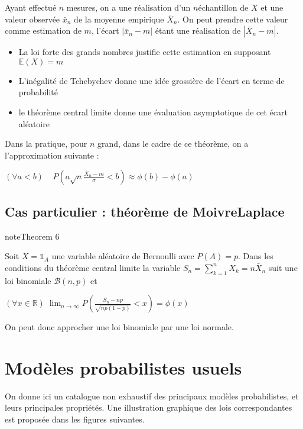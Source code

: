 \documentclass[letterpaper,10pt,english]{jupyterBook}
\begin{document}
\sphinxAtStartPar
Ayant effectué \(n\) mesures, on a une réalisation d’un \(n\)\sphinxhyphen{}échantillon de \(X\) et une valeur observée \(\bar x_n\) de la moyenne empirique \(\bar X_n\). On peut prendre cette valeur comme estimation de \(m\), l’écart \(|\bar x_n-m|\) étant une réalisation de \(|\bar X_n-m|\).
\begin{itemize}
\item {} 
\sphinxAtStartPar
La loi forte des grands nombres justifie cette estimation en supposant  \(\mathbb{E}(X)=m\)

\item {} 
\sphinxAtStartPar
L’inégalité de Tchebychev donne une idée grossière de l’écart en terme de probabilité

\item {} 
\sphinxAtStartPar
le théorème central limite donne une évaluation asymptotique de cet écart aléatoire

\end{itemize}

\sphinxAtStartPar
Dans la pratique, pour \(n\) grand, dans le cadre de ce théorème, on a l’approximation suivante :

\sphinxAtStartPar
\((\forall a<b)\;\;\;\; P\left (a\sqrt{n}\frac{\bar X_n-m}{\sigma} <b\right)\approx \phi(b)-\phi(a)\)


\subsection{Cas particulier : théorème de Moivre\sphinxhyphen{}Laplace}
\label{\detokenize{elemstats:cas-particulier-theoreme-de-moivre-laplace}}\label{elemstats:theorem-10}
\begin{sphinxadmonition}{note}{Theorem 6}



\sphinxAtStartPar
Soit \(X=\mathbb{1}_A\)  une variable aléatoire de Bernoulli avec \(P(A)=p\). Dans les conditions du théorème central limite la variable \(S_n=\displaystyle\sum_{k=1}^n X_k=n\bar X_n\) suit une loi binomiale \(\mathcal{B}(n,p)\) et

\sphinxAtStartPar
\( (\forall x\in\mathbb{R})\; \displaystyle\lim_{n\rightarrow\infty}P\left (\frac{S_n-np}{\sqrt{np(1-p)}} <x\right) = \phi(x)\)
\end{sphinxadmonition}

\sphinxAtStartPar
On peut donc approcher une loi binomiale par une loi normale.


\section{Modèles probabilistes usuels}
\label{\detokenize{elemstats:modeles-probabilistes-usuels}}\label{\detokenize{elemstats:loisusuelles}}
\sphinxAtStartPar
On donne ici un catalogue non exhaustif des principaux modèles probabilistes, et leurs principales propriétés. Une illustration graphique des lois correspondantes est proposée dans les figures suivantes.
\end{document}
